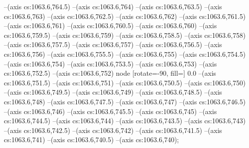 --(axis cs:1063.6,764.5)
--(axis cs:1063.6,764)
--(axis cs:1063.6,763.5)
--(axis cs:1063.6,763)
--(axis cs:1063.6,762.5)
--(axis cs:1063.6,762)
--(axis cs:1063.6,761.5)
--(axis cs:1063.6,761)
--(axis cs:1063.6,760.5)
--(axis cs:1063.6,760)
--(axis cs:1063.6,759.5)
--(axis cs:1063.6,759)
--(axis cs:1063.6,758.5)
--(axis cs:1063.6,758)
--(axis cs:1063.6,757.5)
--(axis cs:1063.6,757)
--(axis cs:1063.6,756.5)
--(axis cs:1063.6,756)
--(axis cs:1063.6,755.5)
--(axis cs:1063.6,755)
--(axis cs:1063.6,754.5)
--(axis cs:1063.6,754)
--(axis cs:1063.6,753.5)
--(axis cs:1063.6,753)
--(axis cs:1063.6,752.5)
--(axis cs:1063.6,752) node [rotate=-90, fill=\bgcol] {0.0}
--(axis cs:1063.6,751.5)
--(axis cs:1063.6,751)
--(axis cs:1063.6,750.5)
--(axis cs:1063.6,750)
--(axis cs:1063.6,749.5)
--(axis cs:1063.6,749)
--(axis cs:1063.6,748.5)
--(axis cs:1063.6,748)
--(axis cs:1063.6,747.5)
--(axis cs:1063.6,747)
--(axis cs:1063.6,746.5)
--(axis cs:1063.6,746)
--(axis cs:1063.6,745.5)
--(axis cs:1063.6,745)
--(axis cs:1063.6,744.5)
--(axis cs:1063.6,744)
--(axis cs:1063.6,743.5)
--(axis cs:1063.6,743)
--(axis cs:1063.6,742.5)
--(axis cs:1063.6,742)
--(axis cs:1063.6,741.5)
--(axis cs:1063.6,741)
--(axis cs:1063.6,740.5)
--(axis cs:1063.6,740);

